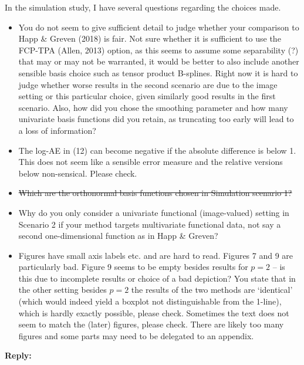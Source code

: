 \documentclass[11pt]{article}
\begin{document}
In the simulation study, I have several questions regarding the choices made.
\begin{itemize}
  \item You do not seem to give sufficient detail to judge whether your comparison to Happ \& Greven (2018) is fair. Not sure whether it is sufficient to use the FCP-TPA (Allen, 2013) option, as this seems to assume some separability (?) that may or may not be warranted, it would be better to also include another sensible basis choice such as tensor product B-splines. Right now it is hard to judge whether worse results in the second scenario are due to the image setting or this particular choice, given similarly good results in the first scenario. Also, how did you chose the smoothing parameter and how many univariate basis functions did you retain, as truncating too early will lead to a loss of information?
  \item The log-AE in (12) can become negative if the absolute difference is below 1. This does not seem like a sensible error measure and the relative versions below non-sensical. Please check.
  \item \sout{Which are the orthonormal basis functions chosen in Simulation scenario 1?}
  \item Why do you only consider a univariate functional (image-valued) setting in Scenario 2 if your method targets multivariate functional data, not say a second one-dimensional function as in Happ \& Greven?
  \item Figures have small axis labels etc. and are hard to read. Figures 7 and 9 are particularly bad. Figure 9 seems to be empty besides results for $p=2$ – is this due to incomplete results or choice of a bad depiction? You state that in the other setting besides $p=2$ the results of the two methods are ‘identical’ (which would indeed yield a boxplot not distinguishable from the 1-line), which is hardly exactly possible, please check. Sometimes the text does not seem to match the (later) figures, please check. There are likely too many figures and some parts may need to be delegated to an appendix.
\end{itemize}


\medskip

\normalfont

\textbf{Reply:}
\end{document}
